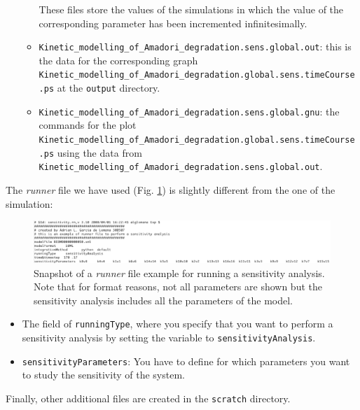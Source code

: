 \documentclass[a4paper, 11pt]{article}
\begin{document}
\begin{itemize}
\begin{itemize}
      These files store the values of the simulations in which the value of the corresponding parameter has been incremented infinitesimally. 	    
    \item
      \texttt{Kinetic\_modelling\_of\_Amadori\_degradation.sens.global.out}: this is the data for the corresponding graph \\ \texttt{Kinetic\_modelling\_of\_Amadori\_degradation.global.sens.timeCourse.ps} at the \texttt{output} directory.
    \item
      \texttt{Kinetic\_modelling\_of\_Amadori\_degradation.sens.global.gnu}: the commands for the plot \\ \texttt{Kinetic\_modelling\_of\_Amadori\_degradation.global.sens.timeCourse.ps} using the data from \texttt{Kinetic\_modelling\_of\_Amadori\_degradation.sens.global.out}.
    \end{itemize}
  \end{itemize}
  The \emph{runner} file we have used (Fig. \ref{sensitivityRunner}) is slightly different from the one of the simulation:
  \begin{figure}[t]
    \begin{center}
      \includegraphics[scale=.75]{figures/sensitivityRunner.eps}
      \caption{
        Snapshot of a \emph{runner} file example for running a sensitivity analysis.
        Note that for format reasons, not all parameters are shown but the sensitivity analysis includes all the parameters of the model.
      }
      \label{sensitivityRunner}
    \end{center}
  \end{figure}
  \begin{itemize}
  \item
    The field of \texttt{runningType}, where you specify that you want to perform a sensitivity analysis by setting the variable to \texttt{sensitivityAnalysis}.
  \item
    \texttt{sensitivityParameters}: You have to define for which parameters you want to study the sensitivity of the system.
  \end{itemize}  
  Finally, other additional files are created in the \texttt{scratch} directory.
\end{document}
